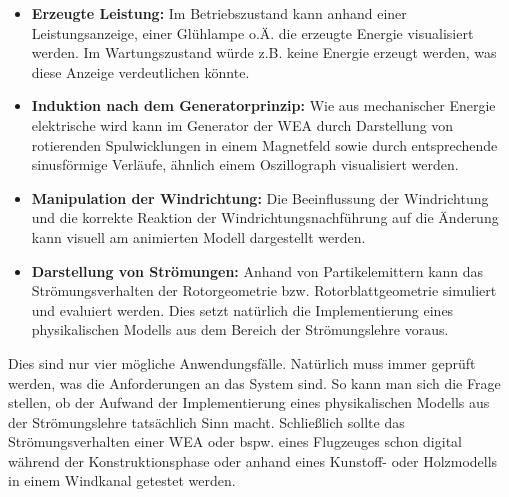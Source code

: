 \begin{itemize}
\item \textbf{Erzeugte Leistung:} Im Betriebszustand kann anhand einer Leistungsanzeige, einer Glühlampe o.Ä. die erzeugte Energie visualisiert werden. Im Wartungszustand würde z.B. keine Energie erzeugt werden, was diese Anzeige verdeutlichen könnte.
 
\item \textbf{Induktion nach dem Generatorprinzip:} Wie aus mechanischer Energie elektrische wird kann im Generator der WEA durch Darstellung von rotierenden Spulwicklungen in einem Magnetfeld sowie durch entsprechende sinusförmige Verläufe, ähnlich einem Oszillograph visualisiert werden.
 
\item \textbf{Manipulation der Windrichtung:} Die Beeinflussung der Windrichtung und die korrekte Reaktion der Windrichtungsnachführung auf die Änderung kann visuell am animierten Modell dargestellt werden.

\item \textbf{Darstellung von Strömungen:} Anhand von Partikelemittern kann das Strömungsverhalten der Rotorgeometrie bzw. Rotorblattgeometrie simuliert und evaluiert werden. Dies setzt natürlich die Implementierung eines physikalischen Modells aus dem Bereich der Strömungslehre voraus. 
 
\end{itemize} 

Dies sind nur vier mögliche Anwendungsfälle. Natürlich muss immer geprüft werden, was die Anforderungen an das System sind. So kann man sich die Frage stellen, ob der Aufwand der Implementierung eines physikalischen Modells aus der Strömungslehre tatsächlich Sinn macht. Schließlich sollte das Strömungsverhalten einer WEA oder bspw. eines Flugzeuges schon digital während der  Konstruktionsphase oder anhand eines Kunstoff- oder Holzmodells in einem Windkanal getestet werden. 

